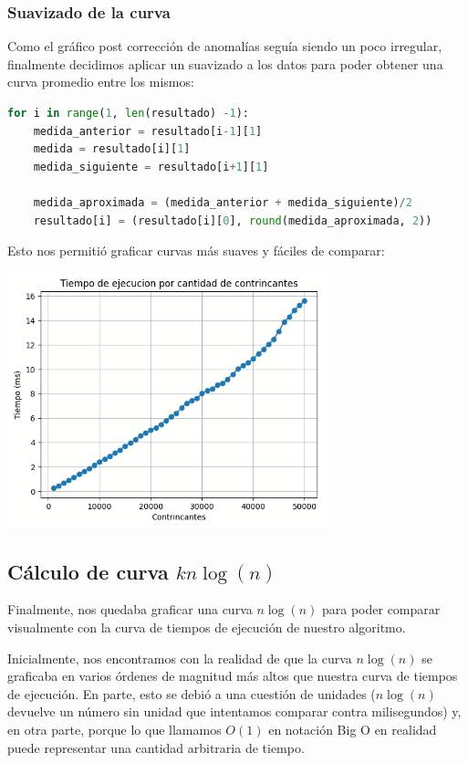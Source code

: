 \documentclass{estilo}
\begin{document}
\subsubsection{Suavizado de la curva}
Como el gráfico post corrección de anomalías seguía siendo un poco irregular, finalmente decidimos aplicar un suavizado a los datos para poder obtener una curva promedio entre los mismos:
\begin{lstlisting}[language=Python]
for i in range(1, len(resultado) -1):
    medida_anterior = resultado[i-1][1]
    medida = resultado[i][1]
    medida_siguiente = resultado[i+1][1]

    medida_aproximada = (medida_anterior + medida_siguiente)/2
    resultado[i] = (resultado[i][0], round(medida_aproximada, 2))
\end{lstlisting}
Esto nos permitió graficar curvas más suaves y fáciles de comparar:
\begin{center}
\includegraphics[width=0.7\textwidth]{img/Smoothed.png}
\end{center}

\subsection{Cálculo de curva $k n \log (n)$}

Finalmente, nos quedaba graficar una curva $n \log (n)$ para poder comparar visualmente con la curva de tiempos de ejecución de nuestro algoritmo.

Inicialmente, nos encontramos con la realidad de que la curva $n \log (n)$ se graficaba en varios órdenes de magnitud más altos que nuestra curva de tiempos de ejecución. En parte, esto se debió a una cuestión de unidades ($n \log (n)$ devuelve un número sin unidad que intentamos comparar contra milisegundos) y, en otra parte, porque lo que llamamos $O(1)$ en notación Big O en realidad puede representar una cantidad arbitraria de tiempo.
\end{document}
